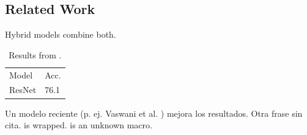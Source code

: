 \subsection{Related Work}
Hybrid models \cite{vaswani2017, lecun1998} combine both.
\begin{table}
\caption{Results from \cite{caption2022}.}
\begin{tabular}{ll}
Model & Acc. \\
ResNet \cite{he2016} & 76.1 \\
\end{tabular}
\end{table}
Un modelo reciente (p. ej. Vaswani et al. \cite{vaswani2017}) mejora los resultados. Otra frase sin cita.
 is wrapped.  is an unknown macro.
\nocite{nocited2019}
